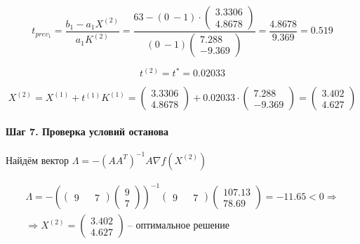 \begin{equation*}
	t_{prev_1} = \frac{b_1 - a_1 X^{(2)}}{a_1 K^{(2)}} = \frac{63 - (0\ -1) \cdot \begin{pmatrix} 3.3306 \\ 4.8678 \end{pmatrix}}{(0\ -1) \begin{pmatrix} 7.288 \\ -9.369 \end{pmatrix}} = \frac{4.8678}{9.369} = 0.519
\end{equation*}

\begin{equation*}
	t^{(2)} = t^* = 0.02033
\end{equation*}

\begin{equation*}
	X^{(2)} = X^{(1)} + t^{(1)} K^{(1)} = \begin{pmatrix}
		3.3306 \\ 4.8678
	\end{pmatrix}
	+
	0.02033 \cdot \begin{pmatrix} 7.288 \\ -9.369 \end{pmatrix}
	=
	\begin{pmatrix}
		3.402 \\ 4.627
	\end{pmatrix}
\end{equation*}

\paragraph{Шаг 7. Проверка условий останова}

Найдём вектор $\Lambda = - \left( A A^T \right)^{-1} A \nabla f (X^{(2)})$

\begin{equation*}
\begin{aligned}
	\Lambda = -\left( \begin{pmatrix} 9 && 7 \end{pmatrix} \begin{pmatrix} 9 \\ 7 \end{pmatrix} \right)^{-1} \begin{pmatrix} 9 && 7 \end{pmatrix} \begin{pmatrix} 107.13 \\ 78.69 \end{pmatrix} = - 11.65 < 0 \Rightarrow \\ \Rightarrow X^{(2)} = \begin{pmatrix}
		3.402 \\ 4.627
	\end{pmatrix}\ \text{-- оптимальное решение}
\end{aligned}
\end{equation*}

